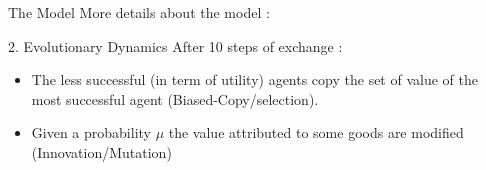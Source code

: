 \documentclass[8pt, handout=show,notes=show]{beamer}
\begin{document}
\begin{frame}{The Model}
    More details about the model : 
    \vfill
	\begin{block}{2. Evolutionary Dynamics}
		After 10 steps of exchange :
		\begin{itemize}
			\item  The less successful (in term of utility) agents copy the set of value of the most successful agent (Biased-Copy/selection).
			\item Given a probability $\mu$ the value attributed to some goods are modified (Innovation/Mutation)
		\end{itemize}

	\end{block}
\end{frame}



%
%
%
%
%
\end{document}
